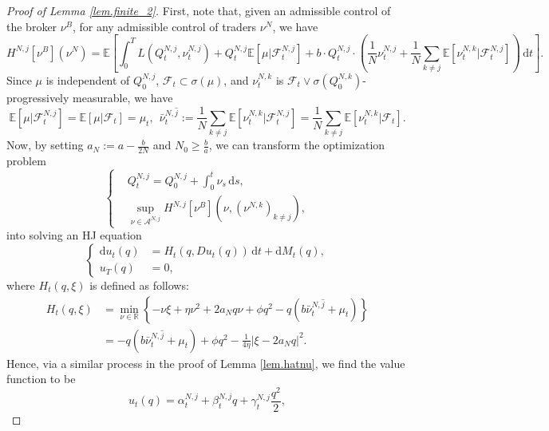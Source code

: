 \documentclass[10pt]{article}
\begin{document}
\begin{proof}[Proof of Lemma \ref{lem.finite_2}]

First, note that, given an admissible control of the broker $\nu^B$, for any admissible control of traders $\nu^N$, we have
\begin{equation*}
    H^{N,j} [\nu^B] (\nu^N) = \mathbb{E} \left[ \int_0^T L(Q_t^{N,j},\nu^{N,j}_t) + Q_t^{N,j} \mathbb{E} [\mu | \mathcal{F}^{N,j}_t ] + b \cdot Q_t^{N,j} \cdot \left( \frac{1}{N} \nu^{N,j}_t + \frac{1}{N} \sum_{k \neq j} \mathbb{E} [\nu^{N,k}_t | \mathcal{F}_t^{N,j} ] \right) \, \mathrm{d}t \right].
\end{equation*}
Since $\mu$ is independent of $Q_0^{N,j}$, $\mathcal{F}_t \subset \sigma(\mu)$, and $\nu^{N,k}_t$ is $\mathcal{F}_t \vee \sigma(Q_0^{N,k})$-progressively measurable, we have 
\[
\mathbb{E} [\mu | \mathcal{F}^{N,j}_t ] = \mathbb{E} [\mu | \mathcal{F}_t ] = \mu_t, ~~
\bar \nu^{N,\hat{j}}_t := \frac{1}{N} \sum_{k \neq j} \mathbb{E} [\nu^{N,k}_t | \mathcal{F}_t^{N,j} ] = \frac{1}{N} \sum_{k \neq j} \mathbb{E} [\nu^{N,k}_t | \mathcal{F}_t ].
\]
Now, by setting $a_N := a - \frac{b}{2N}$ and $N_0 \geq \frac{b}{a}$, we can transform the optimization problem
\[
\left\{
    \begin{aligned}
        & Q_t^{N,j} = Q_0^{N,j} + \int_0^t \nu_s \, \mathrm{d}s, \\
        & \underset{\nu \in \mathcal{A}^{N,j}}{\sup} H^{N,j}[\nu^B] (\nu, (\nu^{N,k})_{k \neq j}),
    \end{aligned}
\right.
\]
into solving an HJ equation
\begin{equation*}
    \left\{
    \begin{aligned}
        \mathrm{d}u_t(q) &= H_t(q, D u_t (q)) \, \mathrm{d}t + \mathrm{d} M_t(q), \\
        u_T(q) &= 0,
    \end{aligned}
    \right.
\end{equation*}
where $H_t(q, \xi)$ is defined as follows:
\begin{align*}
    H_t(q, \xi) &= \min_{\nu \in \mathbb{R}} \left\{  -\nu\xi + \eta \nu^2 + 2 a_N q \nu + \phi q^2 - q (b \bar \nu^{N,\hat{j}}_t + \mu_t)  \right\} \\
    &= - q (b \bar \nu^{N,\hat{j}}_t + \mu_t) + \phi q^2 - \frac{1}{4\eta} \left| \xi - 2 a_N q \right|^2.
\end{align*}
Hence, via a similar process in the proof of Lemma \ref{lem.hatnu}, we find the value function to be
\[
u_t(q) = \alpha^{N,j}_t + \beta^{N,j}_t q + \gamma^{N,j}_t \frac{q^2}{2},
\]
\end{proof}
\end{document}
